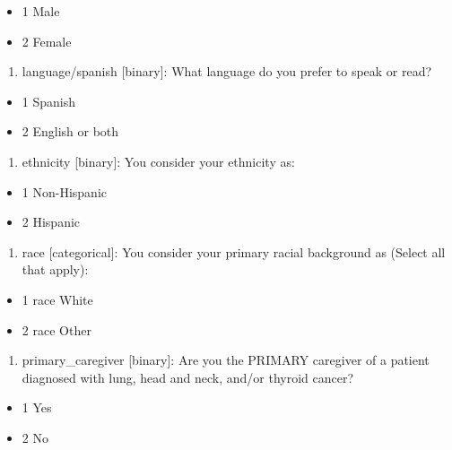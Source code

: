 \documentclass[
  letterpaper,
  DIV=11,
  numbers=noendperiod]{scrreprt}
\providecommand{\tightlist}{%
  \setlength{\itemsep}{0pt}\setlength{\parskip}{0pt}}\usepackage{longtable,booktabs,array}
\begin{document}
\begin{itemize}
\tightlist
\item
  1 Male
\item
  2 Female
\end{itemize}

\begin{enumerate}
\def\labelenumi{\arabic{enumi}.}
\setcounter{enumi}{5}
\tightlist
\item
  language/spanish {[}binary{]}: What language do you prefer to speak or
  read?
\end{enumerate}

\begin{itemize}
\tightlist
\item
  1 Spanish
\item
  2 English or both
\end{itemize}

\begin{enumerate}
\def\labelenumi{\arabic{enumi}.}
\setcounter{enumi}{6}
\tightlist
\item
  ethnicity {[}binary{]}: You consider your ethnicity as:
\end{enumerate}

\begin{itemize}
\tightlist
\item
  1 Non-Hispanic
\item
  2 Hispanic
\end{itemize}

\begin{enumerate}
\def\labelenumi{\arabic{enumi}.}
\setcounter{enumi}{7}
\tightlist
\item
  race {[}categorical{]}: You consider your primary racial background as
  (Select all that apply):
\end{enumerate}

\begin{itemize}
\tightlist
\item
  1 race White
\item
  2 race Other
\end{itemize}

\begin{enumerate}
\def\labelenumi{\arabic{enumi}.}
\setcounter{enumi}{8}
\tightlist
\item
  primary\_caregiver {[}binary{]}: Are you the PRIMARY caregiver of a
  patient diagnosed with lung, head and neck, and/or thyroid cancer?
\end{enumerate}

\begin{itemize}
\tightlist
\item
  1 Yes
\item
  2 No
\end{itemize}
\end{document}
